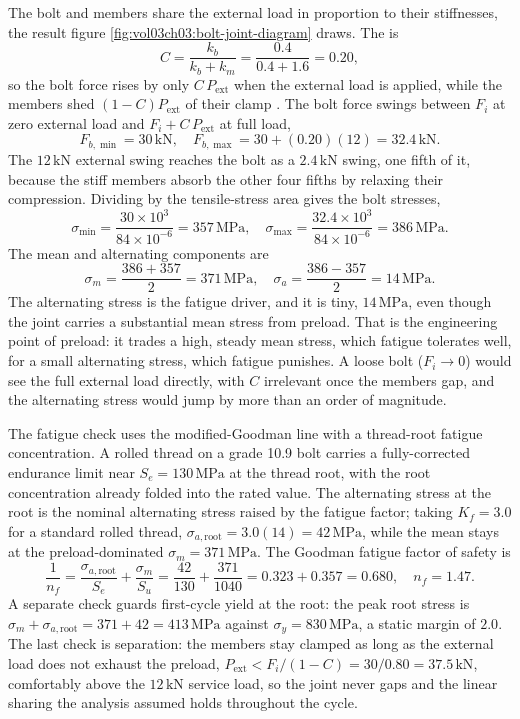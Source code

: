

The bolt and members share the external load in proportion to their
stiffnesses, the result figure \ref{fig:vol03ch03:bolt-joint-diagram}
draws. The  is
\[
C = \frac{k_b}{k_b + k_m} = \frac{0.4}{0.4 + 1.6} = 0.20,
\]
so the bolt force rises by only $C\,P_{\text{ext}}$ when the external
load is applied, while the members shed $(1 - C)P_{\text{ext}}$ of their
clamp \cite[ch.~8]{text:shigley-mechanical-design}. The bolt force swings
between $F_i$ at zero external load and $F_i + C\,P_{\text{ext}}$ at full
load,
\[
F_{b,\min} = 30\,\text{kN}, \quad F_{b,\max} = 30 + (0.20)(12) = 32.4\,
\text{kN}.
\]
The $12\,\text{kN}$ external swing reaches the bolt as a $2.4\,\text{kN}$
swing, one fifth of it, because the stiff members absorb the other four
fifths by relaxing their compression. Dividing by the tensile-stress
area gives the bolt stresses,
\[
\sigma_{\min} = \frac{30\times 10^3}{84\times 10^{-6}} = 357\,\text{MPa},
\quad \sigma_{\max} = \frac{32.4\times 10^3}{84\times 10^{-6}} = 386\,
\text{MPa}.
\]
The mean and alternating components are
\[
\sigma_m = \frac{386 + 357}{2} = 371\,\text{MPa}, \quad \sigma_a =
\frac{386 - 357}{2} = 14\,\text{MPa}.
\]
The alternating stress is the fatigue driver, and it is tiny, $14\,\text{
MPa}$, even though the joint carries a substantial mean stress from
preload. That is the engineering point of preload: it trades a high,
steady mean stress, which fatigue tolerates well, for a small alternating
stress, which fatigue punishes. A loose bolt ($F_i \to 0$) would see the
full external load directly, with $C$ irrelevant once the members gap,
and the alternating stress would jump by more than an order of magnitude.

The fatigue check uses the modified-Goodman line with a thread-root
fatigue concentration. A rolled thread on a grade 10.9 bolt carries a
fully-corrected endurance limit near $S_e = 130\,\text{MPa}$ at the
thread root, with the root concentration already folded into the rated
value. The alternating stress at the root is the nominal alternating
stress raised by the fatigue factor; taking $K_f = 3.0$ for a standard
rolled thread, $\sigma_{a,\text{root}} = 3.0(14) = 42\,\text{MPa}$, while
the mean stays at the preload-dominated $\sigma_m = 371\,\text{MPa}$. The
Goodman fatigue factor of safety is
\[
\frac{1}{n_f} = \frac{\sigma_{a,\text{root}}}{S_e} + \frac{\sigma_m}{S_u}
= \frac{42}{130} + \frac{371}{1040} = 0.323 + 0.357 = 0.680, \quad n_f =
1.47.
\]
A separate check guards first-cycle yield at the root: the peak root
stress is $\sigma_m + \sigma_{a,\text{root}} = 371 + 42 = 413\,\text{MPa}$
against $\sigma_y = 830\,\text{MPa}$, a static margin of $2.0$. The last
check is separation: the members stay clamped as long as the external
load does not exhaust the preload, $P_{\text{ext}} < F_i/(1 - C) = 30/
0.80 = 37.5\,\text{kN}$, comfortably above the $12\,\text{kN}$ service
load, so the joint never gaps and the linear sharing the analysis assumed
holds throughout the cycle.


